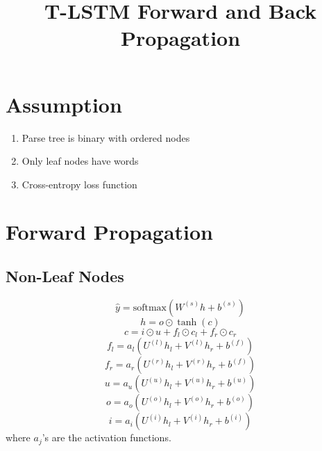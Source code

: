 \documentclass[12pt]{article}
\title{T-LSTM Forward and Back Propagation}
\begin{document}
\maketitle

\section{Assumption}
\begin{enumerate}
	\item Parse tree is binary with ordered nodes
	\item Only leaf nodes have words
	\item Cross-entropy loss function
\end{enumerate}

\section{Forward Propagation}
\subsection{Non-Leaf Nodes}
\begin{equation}
	\hat{y} = \text{softmax}(W^{(s)}h+b^{(s)})
\end{equation}
\begin{equation}
	h = o \odot \tanh(c)
\end{equation}
\begin{equation}
	c = i \odot u + f_l \odot c_l + f_r \odot c_r
\end{equation}
\begin{equation}
	f_l = a_l(U^{(l)}h_l+V^{(l)}h_r+b^{(f)})
\end{equation}
\begin{equation}
	f_r = a_r(U^{(r)}h_l+V^{(r)}h_r+b^{(f)})
\end{equation}
\begin{equation}
	u = a_u(U^{(u)}h_l+V^{(u)}h_r+b^{(u)})
\end{equation}
\begin{equation}
	o = a_o(U^{(o)}h_l+V^{(o)}h_r+b^{(o)})
\end{equation}
\begin{equation}
	i = a_i(U^{(i)}h_l+V^{(i)}h_r+b^{(i)})
\end{equation}
where $a_j$'s are the activation functions.
\end{document}
